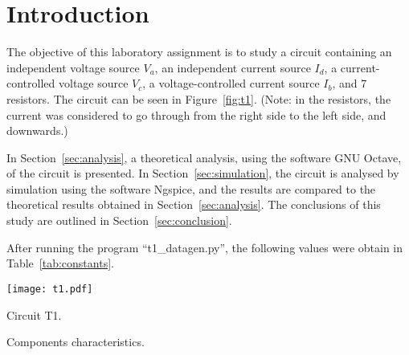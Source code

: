 \section{Introduction}
\label{sec:introduction}

The objective of this laboratory assignment is to study a circuit containing an
independent voltage source $V_a$, an independent current source $I_d$, a current-controlled voltage source $V_c$, a voltage-controlled current source $I_b$, and 7 resistors. The circuit can be seen in Figure~\ref{fig:t1}. (Note: in the resistors, the current was considered to go through from the right side to the left side, and downwards.)


In Section~\ref{sec:analysis}, a theoretical analysis, using the software GNU Octave, of the circuit is
presented. In Section~\ref{sec:simulation}, the circuit is analysed by
simulation using the software Ngspice, and the results are compared to the theoretical results obtained in
Section~\ref{sec:analysis}. The conclusions of this study are outlined in
Section~\ref{sec:conclusion}.



After running the program ``t1\_datagen.py'', the following values were obtain in Table~\ref{tab:constants}.

\begin{minipage}[b]{0.48\textwidth}
\centering
    \texttt{[image: t1.pdf]}
    \captionsetup{type=figure}
\caption{Circuit T1.}
\label{fig:t1}
\end{minipage}
\begin{minipage}[b]{0.48\textwidth}
\centering
    
    \captionsetup{type=table}
  \caption{Components characteristics.}
  \label{tab:constants}
\end{minipage}
